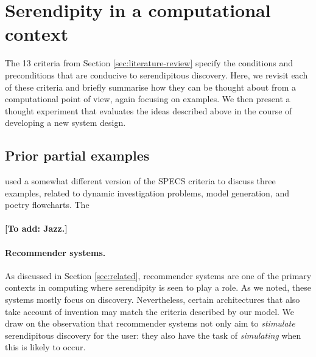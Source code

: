 \section{Serendipity in a computational context} \label{sec:computational-serendipity}

The 13 criteria from Section \ref{sec:literature-review} specify the
conditions and preconditions that are conducive to serendipitous
discovery.  Here, we revisit each of these criteria and briefly
summarise how they can be thought about from a computational point of
view, again focusing on examples.  We then present a thought
experiment that evaluates the ideas described above in the course of
developing a new system design.

% 

\subsection{Prior partial examples}

 used a somewhat different version of the
SPECS criteria to discuss three examples, related to dynamic
investigation problems, model generation, and poetry flowcharts.  The 

\paragraph{{[}To add: Jazz.{]}}


\paragraph{Recommender systems.} 

As discussed in Section \ref{sec:related}, recommender systems are one
of the primary contexts in computing where serendipity is seen to play
a role.  As we noted, these systems mostly focus on discovery.
Nevertheless, certain architectures that also take account of
invention may match the criteria described by our model.  We draw on
the observation that recommender systems not only aim to
\emph{stimulate} serendipitous discovery for the user: they also have
the task of \emph{simulating} when this is likely to occur.

